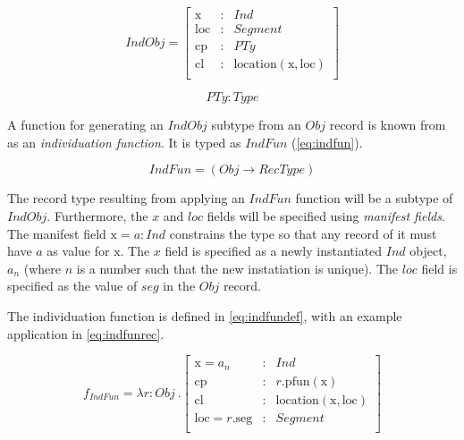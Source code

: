 \begin{equation}\label{eq:indobj}
IndObj = \left[\begin{array}{rcl}
\text{x} &:& Ind \\
\text{loc} &:& Segment \\
\text{cp} &:& PTy \\
\text{cl} &:& \text{location}(\text{x}, \text{loc}) \\
\end{array}\right]
\end{equation}

\begin{equation}\label{eq:pty}
PTy : Type
\end{equation}

A function for generating an $IndObj$ subtype from an $Obj$ record is known from \cite{lspc} as an \textit{individuation function}.
It is typed as $IndFun$ (\autoref{eq:indfun}).

\begin{equation}\label{eq:indfun}
IndFun = ( Obj \rightarrow RecType )
\end{equation}

The record type resulting from applying an $IndFun$ function will be a subtype of $IndObj$.
Furthermore, the $x$ and $loc$ fields will be specified using \textit{manifest fields}.
The manifest field $\text{x} = a : Ind$ constrains the type so that any record of it must have $a$ as value for $\text{x}$.
The $x$ field is specified as a newly instantiated $Ind$ object, $a_n$ (where $n$ is a number such that the new instatiation is unique).
The $loc$ field is specified as the value of $seg$ in the $Obj$ record.


The individuation function is defined in \autoref{eq:indfundef}, with an example application in \autoref{eq:indfunrec}.

\begin{equation}\label{eq:indfundef}
f_{IndFun} = \lambda r : Obj\ . \left[\begin{array}{lcl}
    \text{x} = a_n &:& Ind \\
    \text{cp} &:& r.\text{pfun}(\text{x}) \\
    \text{cl} &:& \text{location}(\text{x}, \text{loc}) \\
    \text{loc} = r.\text{seg} &:& Segment\\
\end{array}\right]
\end{equation}

